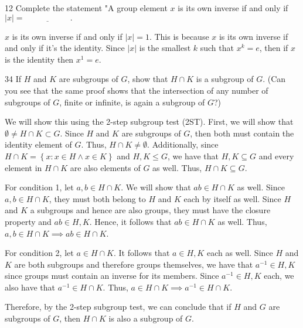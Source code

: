 \begin{hwproblem}
{12}{
    Complete the statement "A group element $x$ is its own inverse if and only if $|x|= \underline{\phantom{wowowowow}}.$
}

\(x\) is its own inverse if and only if \(|x| = 1\). This is because \(x\) is its own inverse if and only if it's the identity. Since \(|x|\) is the smallest \(k\) such that \(x^k=e\), then if \(x\) is the identity then \(x^1 = e\).
\end{hwproblem}

\begin{hwproblem}
{34}{
    If $H$ and $K$ are subgroups of $G$, show that $H \cap K$ is a subgroup of $G$. (Can you see that the same proof shows that the intersection of any number of subgroups of $G$, finite or infinite, is again a subgroup of $G$?)
}

We will show this using the 2-step subgroup test (2ST). First, we will show that \(\emptyset \neq H \cap K \subset G\). Since \(H\) and \(K\) are subgroups of \(G\), then both must contain the identity element of \(G\). Thus, \(H \cap K \neq \emptyset\). Additionally, since \(H \cap K = \left\{x : x \in H \land x \in K\right\}\) and \(H, K \leq G\), we have that \(H, K \subseteq G\) and every element in \(H \cap K\) are also elements of \(G\) as well. Thus, \(H \cap K \subseteq G\).

For condition 1, let \(a, b \in H \cap K\). We will show that \(ab \in H \cap K\) as well. Since \(a, b \in H \cap K\), they must both belong to \(H\) and \(K\) each by itself as well. Since \(H\) and \(K\) a subgroups and hence are also groups, they must have the closure property and \(ab \in H, K\). Hence, it follows that \(ab \in H \cap K\) as well. Thus, \(a, b \in H \cap K \implies ab \in H \cap K\).

For condition 2, let \(a \in H \cap K\). It follows that \(a \in H, K\) each as well. Since \(H\) and \(K\) are both subgroups and therefore groups themselves, we have that \(a^{-1} \in H, K\) since groups must contain an inverse for its members. Since \(a^{-1} \in H, K\) each, we also have that \(a^{-1} \in H \cap K\). Thus, \(a \in H \cap K \implies a^{-1} \in H \cap K\).

Therefore, by the 2-step subgroup test, we can conclude that if \(H\) and \(G\) are subgroups of \(G\), then \(H \cap K\) is also a subgroup of \(G\).
\end{hwproblem}

